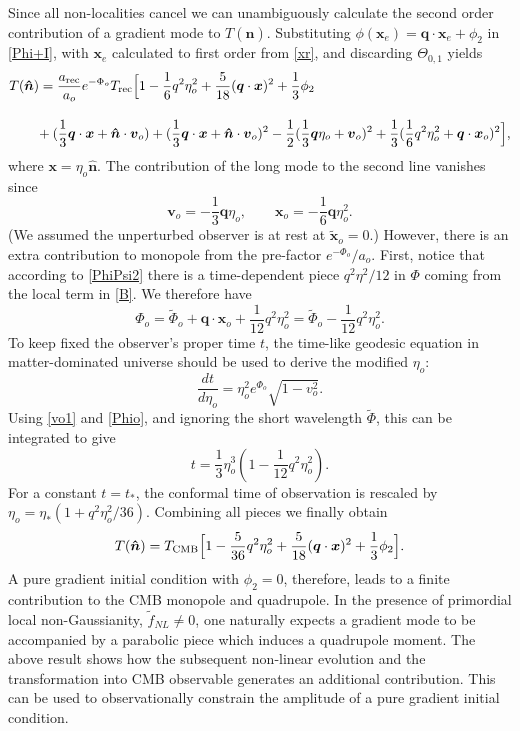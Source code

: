 \documentclass[12pt]{article}
\numberwithin{equation}{section}
\def\bsb{\boldsymbol}
\def\be{\begin{equation}}
\def\ee{\end{equation}}
\def\n{\bsb{\hat n}}
\def\x{{\bsb x}}
\def\v{\bsb v}
\def\q{{\bsb q}}
\begin{document}
Since all non-localities cancel we can unambiguously calculate the second order contribution of a gradient mode to $T(\n)$. Substituting $\phi(\x_e) = \q\cdot\x_e +\phi_2$ in \eqref{Phi+I}, with $\x_e$ calculated to first order from \eqref{xr}, and discarding $\Theta_{0,1}$ yields
\be
\begin{split}
&T(\bsb{\hat n})
=\frac{a_{\rm rec}}{a_o} e^{-\Phi_o}T_{\rm rec}\Big[1-\frac{1}{6}q^2\eta_o^2
+\frac{5}{18}(\bsb q\cdot \bsb x)^2+\frac{1}{3}\phi_2\\[10pt]
&~~~~~~+(\frac{1}{3}\bsb q\cdot \bsb x+\bsb{\hat n}\cdot \bsb v_o )+(\frac{1}{3}\bsb q\cdot \bsb x+\bsb{\hat n}\cdot \bsb v_o )^2-\frac{1}{2}(\frac{1}{3}\bsb q\eta_o+\bsb v_o)^2
+\frac{1}{3}(\frac{1}{6}q^2\eta_o^2+\q \cdot \x_o)^2\Big],
\end{split}
\ee
where $\x = \eta_o \n$. The contribution of the long mode to the second line vanishes since
\be
\label{vo1}
\v_o = -\frac{1}{3}\q\eta_o,\qquad \x_o= -\frac{1}{6}\q \eta_o^2.
\ee
(We assumed the unperturbed observer is at rest at $\tilde\x_o =0$.) However, there is an extra contribution to monopole from the pre-factor $ e^{-\Phi_o}/a_o$. First, notice that according to \eqref{PhiPsi2} there is a time-dependent piece $q^2\eta^2/12$ in $\Phi$ coming from the local term in \eqref{B}. We therefore have
\be
\label{Phio}
\Phi_o = \tilde\Phi_o + \q\cdot\x_o +\frac{1}{12}q^2\eta_o^2 = \tilde\Phi_o - \frac{1}{12}q^2\eta_o^2.
\ee
To keep fixed the observer's proper time $t$, the time-like geodesic equation in matter-dominated universe should be used to derive the modified $\eta_o$:
\be
\frac{dt}{d\eta_o} = \eta_o^2 e^{\Phi_o}\sqrt{1-v_o^2}.
\ee
Using \eqref{vo1} and \eqref{Phio}, and ignoring the short wavelength $\tilde\Phi$, this can be integrated to give
\be
t = \frac{1}{3}\eta_o^3\left(1-\frac{1}{12}q^2\eta_o^2\right).
\ee
For a constant $t=t_*$, the conformal time of observation is rescaled by $\eta_o = \eta_*(1+q^2\eta_o^2/36)$. Combining all pieces we finally obtain
\be
T(\bsb{\hat n})
=T_{\rm CMB}\Big[1-\frac{5}{36}q^2\eta_o^2+\frac{5}{18}(\bsb q\cdot \bsb x)^2+\frac{1}{3}\phi_2\Big].
\ee
A pure gradient initial condition with $\phi_2=0$, therefore, leads to a finite contribution to the CMB monopole and quadrupole. In the presence of primordial local non-Gaussianity, $\tilde f_{NL}\neq  0$, one naturally expects a gradient mode to be accompanied by a parabolic piece which induces a quadrupole moment. The above result shows how the subsequent non-linear evolution and the transformation into CMB observable generates an additional contribution. This can be used to observationally constrain the amplitude of a pure gradient initial condition.
\end{document}
